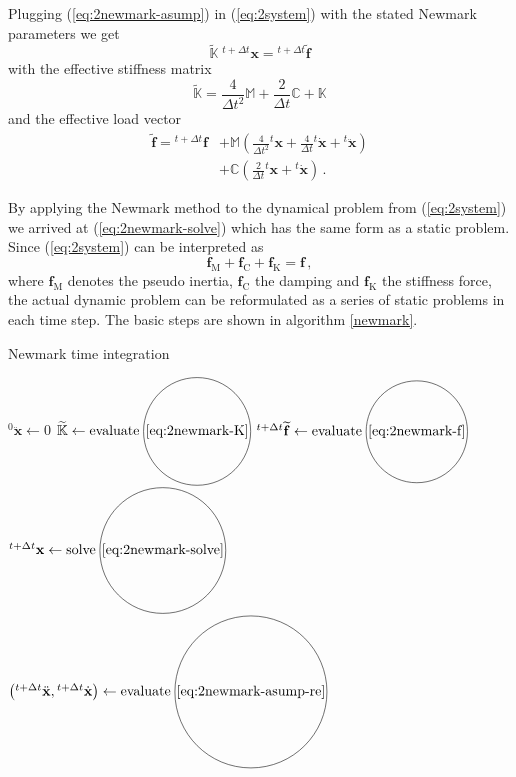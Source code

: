 \documentclass[conference]{journal}%
\newcommand*\circled[1]{\tikz[baseline=(char.base)]{
   \node[shape=circle,draw,inner sep=1pt] (char) {#1};}}
\newcommand{\bb}[1]{\mathbb{#1}}
\newcommand{\B}[1]{\mathbf{#1}}
\newcommand{\Bx}{\B{x}}
\newcommand{\xt}{{}^{t}\Bx}
\newcommand{\vt}{{}^{t}\dot{\Bx}}
\newcommand{\at}{{}^{t}\ddot{\Bx}}
\newcommand{\xtt}{{}^{t+\Delta t}\Bx}
\newcommand{\vtt}{{}^{t+\Delta t}\dot{\Bx}}
\newcommand{\att}{{}^{t+\Delta t}\ddot{\Bx}}
\newcommand{\M}{\bb{M}}
\newcommand{\C}{\bb{C}}
\newcommand{\K}{\bb{K}}
\begin{document}
	Plugging (\ref{eq:2newmark-asump}) in (\ref{eq:2system}) with the stated Newmark parameters we get
	\begin{equation} \label{eq:2newmark-solve}
	\widetilde{\K}\;\xtt = {}^{t+\Delta t}\widetilde{\B{f}}
	\end{equation}
	with the effective stiffness matrix
	\begin{equation} \label{eq:2newmark-K}
	\widetilde{\K} = \frac{4}{\Delta t^2} \M + \frac{2}{\Delta t} \C + \K
	\end{equation}
	and the effective load vector
	\begin{equation} \label{eq:2newmark-f}
	\begin{aligned}
	\widetilde{\B{f}} = {}^{t+\Delta t}{\B{f}}
	&+ \M \left( \frac{4}{\Delta t^2} \xt + \frac{4}{\Delta t} \vt + \at \right)
	\\
	&+ \C \left( \frac{2}{\Delta t} \xt + \vt \right)\,.
	\end{aligned}
	\end{equation}

	By applying the Newmark method to the dynamical problem from (\ref{eq:2system}) we arrived at (\ref{eq:2newmark-solve}) which has the same form as a static problem. Since (\ref{eq:2system}) can be interpreted as
	\begin{equation} \label{eq:2system-forces}
	\B{f}_\mathrm{M} + \B{f}_\mathrm{C} + \B{f}_\mathrm{K} = \B{f}\,,
	\end{equation}
	where $\B{f}_\mathrm{M}$ denotes the pseudo inertia, $\B{f}_\mathrm{C}$ the damping and $\B{f}_\mathrm{K}$ the stiffness force, the actual dynamic problem can be reformulated as a series of static problems in each time step. The basic steps are shown in algorithm \ref{newmark}.

	\begin{algorithm}
	\caption{Newmark time integration}\label{newmark}
	\begin{algorithmic}[1]
	\Procedure{Newmark}{$\M,\, \C,\, \K,\, \B{f}(t),\, \Delta t,\, t_\mathrm{end},\, {}^{0}\Bx,\, {}^{0}\dot{\Bx}$}
	\State ${}^{0}\ddot{\Bx} \gets 0$
	\State $\widetilde{\K} \gets \mathrm{evaluate} \; \circled{\ref{eq:2newmark-K}}$
		\State ${}^{t+\Delta t}\widetilde{\B{f}} \gets \mathrm{evaluate} \; \circled{\ref{eq:2newmark-f}}$
		\State $\xtt \gets \mathrm{solve} \; \circled{\ref{eq:2newmark-solve}}$
		\State $\left(\att,\vtt\right) \gets \mathrm{evaluate} \; \circled{\ref{eq:2newmark-asump-re}}$
	\EndFor
	\EndProcedure
	\end{algorithmic}
	\end{algorithm}
\end{document}
